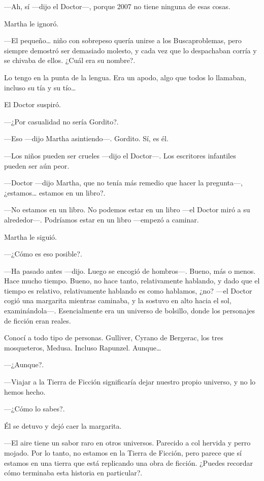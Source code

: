 ---Ah, sí ---dijo el Doctor---, porque 2007 no tiene ninguna de esas cosas.

Martha le ignoró.

---El pequeño\ldots{} niño con sobrepeso quería unirse a los Buscaproblemas, pero siempre demostró ser demasiado molesto, y cada vez que lo despachaban corría y se chivaba de ellos. ¿Cuál era su nombre?.

Lo tengo en la punta de la lengua. Era un apodo, algo que todos lo llamaban, incluso su tía y su tío\ldots{}

El Doctor suspiró.

---¿Por casualidad no sería Gordito?.

---Eso ---dijo Martha asintiendo---. Gordito. Sí, es él.

---Los niños pueden ser crueles ---dijo el Doctor---. Los escritores infantiles pueden ser aún peor.

---Doctor ---dijo Martha, que no tenía más remedio que hacer la pregunta---, ¿estamos\ldots{} estamos en un libro?.

---No estamos en un libro. No podemos estar en un libro ---el Doctor miró a su alrededor---. Podríamos estar en un libro ---empezó a caminar.

Martha le siguió.

---¿Cómo es eso posible?.

---Ha pasado antes ---dijo. Luego se encogió de hombros---. Bueno, más o menos. Hace mucho tiempo. Bueno, no hace tanto, relativamente hablando, y dado que el tiempo es relativo, relativamente hablando es como hablamos, ¿no? ---el Doctor cogió una margarita mientras caminaba, y la sostuvo en alto hacia el sol, examinándola---. Esencialmente era un universo de bolsillo, donde los personajes de ficción eran reales.

Conocí a todo tipo de personas. Gulliver, Cyrano de Bergerac, los tres mosqueteros, Medusa. Incluso Rapunzel. Aunque\ldots{}

---¿Aunque?.

---Viajar a la Tierra de Ficción significaría dejar nuestro propio universo, y no lo hemos hecho.

---¿Cómo lo sabes?.

Él se detuvo y dejó caer la margarita.

---El aire tiene un sabor raro en otros universos. Parecido a col hervida y perro mojado. Por lo tanto, no estamos en la Tierra de Ficción, pero parece que sí estamos en una tierra que está replicando una obra de ficción. ¿Puedes recordar cómo terminaba esta historia en particular?.

